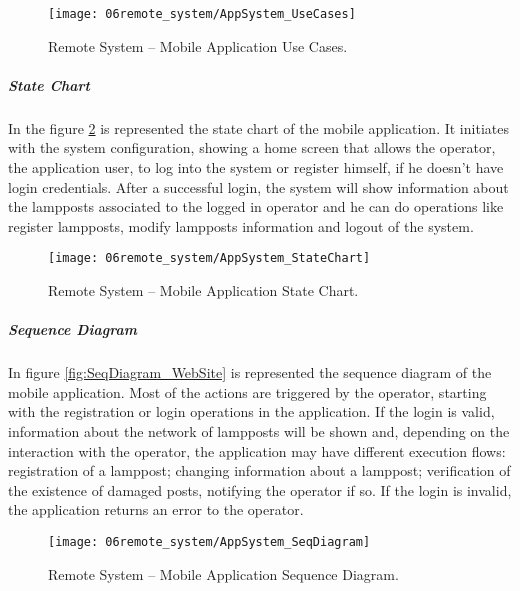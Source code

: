 \begin{figure}[H]
	\centering
	\texttt{[image: 06remote\_system/AppSystem\_UseCases]}
	\caption{Remote System – Mobile Application Use Cases.}
	\label{fig:UseCases_application}
\end{figure}

\subparagraph*{State Chart}
In the figure \ref{fig:StateChart_application} is represented the state chart of the mobile application. It initiates with the system configuration, showing a home screen that allows the operator, the application user, to log into the system or register himself, if he doesn’t have login credentials. After a successful login, the system will show information about the lampposts associated to the logged in operator and he can do operations like register lampposts, modify lampposts information and logout of the system.

\begin{figure}[H]
	\centering
	\texttt{[image: 06remote\_system/AppSystem\_StateChart]}
	\caption{Remote System – Mobile Application State Chart.}
	\label{fig:StateChart_application}
\end{figure}


\subparagraph*{Sequence Diagram}
In figure \ref{fig:SeqDiagram_WebSite} is represented the sequence diagram of the mobile application. Most of the actions are triggered by the operator, starting with the registration or login operations in the application. If the login is valid, information about the network of lampposts will be shown and, depending on the interaction with the operator, the application may have different execution flows: registration of a lamppost; changing information about a lamppost; verification of the existence of damaged posts, notifying the operator if so. If the login is invalid, the application returns an error to the operator.

\begin{figure}[H]
	\centering
	\texttt{[image: 06remote\_system/AppSystem\_SeqDiagram]}
	\caption{Remote System – Mobile Application Sequence Diagram.}
	\label{fig:SeqDiagram_application}
\end{figure}
